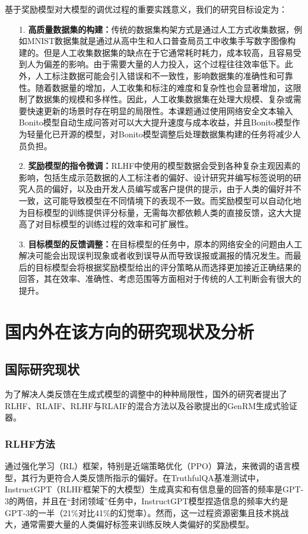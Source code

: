 基于奖励模型对大模型的调优过程的重要实践意义，我们的研究目标设定为：
\begin{itemize}
    \item[1.] \textbf{高质量数据集的构建：}传统的数据集构架方式是通过人工方式收集数据，例如MNIST数据集就是通过从高中生和人口普查局员工中收集手写数字图像构建的。但是人工收集数据集的缺点在于它通常耗时耗力，成本较高，且容易受到人为偏差的影响。由于需要大量的人力投入，这个过程往往效率低下。此外，人工标注数据可能会引入错误和不一致性，影响数据集的准确性和可靠性。随着数据量的增加，人工收集和标注的难度和复杂性也会显著增加，这限制了数据集的规模和多样性。因此，人工收集数据集在处理大规模、复杂或需要快速更新的场景时存在明显的局限性。本课题通过使用网络安全文本输入Bonito模型自动生成问答对可以大大提升速度与成本收益，并且Bonito模型作为轻量化已开源的模型，对Bonito模型调整后处理数据集构建的任务将减少人员负担。
    \item[2.] \textbf{奖励模型的指令微调：}RLHF中使用的模型数据会受到各种复杂主观因素的影响，包括生成示范数据的人工标注者的偏好、设计研究并编写标签说明的研究人员的偏好，以及由开发人员编写或客户提供的提示，由于人类的偏好并不一致，这可能导致模型在不同情境下的表现不一致。而奖励模型可以自动化地为目标模型的训练提供评分标量，无需每次都依赖人类的直接反馈，这大大提高了对目标模型的训练过程的效率和可扩展性。
    \item[3.] \textbf{目标模型的反馈调整：}在目标模型的任务中，原本的网络安全的问题由人工解决可能会出现误判现象或者收到误导从而导致误报或漏报的情况发生。而最后的目标模型会将根据奖励模型给出的评分策略从而选择更加接近正确结果的回答，其在效率、准确性、考虑范围等方面相对于传统的人工判断会有很大的提升。
\end{itemize}

\section{国内外在该方向的研究现状及分析}
\subsection{国际研究现状}
为了解决人类反馈在生成式模型的调整中的种种局限性，国外的研究者提出了RLHF、RLAIF、RLHF与RLAIF的混合方法以及谷歌提出的GenRM生成式验证器。
\subsubsection{RLHF方法}
通过强化学习（RL）框架，特别是近端策略优化（PPO）算法，来微调的语言模型，其行为更符合人类反馈所指示的偏好。在TruthfulQA基准测试中\cite{ouyang2022training}，InstructGPT（RLHF框架下的大模型）生成真实和有信息量的回答的频率是GPT-3的两倍，并且在“封闭领域”任务中，InstructGPT模型捏造信息的频率大约是GPT-3的一半（21\%对比41\%的幻觉率）。然而，这一过程资源密集且技术挑战大\cite{mahan2024generative}，通常需要大量的人类偏好标签来训练反映人类偏好的奖励模型。
